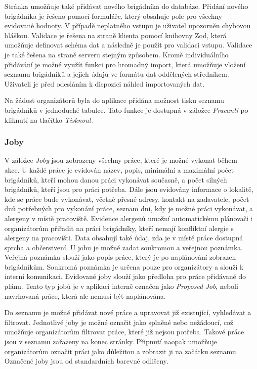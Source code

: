 Stránka umožňuje také přidávat nového brigádníka do databáze. Přidání nového brigádníka je řešeno pomocí formuláře, který obsahuje pole pro všechny evidované
hodnoty. V případě neplatného vstupu je uživatel upozorněn chybovou hláškou. Validace je řešena na straně klienta pomocí knihovny Zod, která umožňuje definovat
schéma dat a následně je použít pro validaci vstupu. Validace je také řešena na straně serveru stejným způsobem. Kromě individuálního přidávání je možné využít
funkci pro hromadný import, která umožňuje vložení seznamu brigádníků a jejich údajů ve formátu dat oddělených středníkem. Uživateli je před odesláním
k dispozici náhled importovaných dat.

Na žádost organizátorů byla do aplikace přidána možnost tisku seznamu brigádníků v jednoduché tabulce. Tato funkce je dostupná v záložce \textit{Pracanti} po kliknutí
na tlačítko \textit{Tisknout}.

\subsubsection{Joby}

V záložce \textit{Joby} jsou zobrazeny všechny práce, které je možné vykonat během akce. U každé práce je evidován název, popis, minimální
a maximální počet brigádníků, kteří mohou danou práci vykonávat současně, a počet silných brigádníků, kteří jsou pro práci potřeba. Dále jsou evidovány
informace o lokalitě, kde se práce bude vykonávat, včetně přesné adresy, kontakt na zadavatele, počet dnů potřebných pro vykonání práce, 
seznam dní, kdy je možné práci vykonávat, a alergeny v místě pracoviště. Evidence alergenů umožní automatickému plánovači i organizátorům přiřadit na práci brigádníky, kteří nemají
konfliktní alergie s alergeny na pracovišti. Data obsahují také údaj, zda je v místě práce dostupná sprcha a občerstvení. 
U jobu je možné zadat soukromou a veřejnou poznámka. Veřejná poznámka slouží jako popis práce, který je po naplánování
zobrazen brigádníkům. Soukromá poznámka je určena pouze pro organizátory a slouží k interní komunikaci. Evidované joby slouží jako předloha pro práce přidávané
do plánu. Tento typ jobů je v aplikaci interně označen jako \textit{Proposed Job}, neboli navrhovaná práce, která ale nemusí být naplánována.

Do seznamu je možné přidávat nové práce a upravovat již existující, vyhledávat a filtrovat.
Jednotlivé joby je možné označit jako splněné nebo nežádoucí, což umožňuje organizátorům filtrovat práce, které již nejsou potřeba. Takové práce jsou v seznamu
zařazeny na konec stránky. Připnutí naopak umožňuje organizátorům označit práci jako důležitou a zobrazit ji na začátku seznamu. Označené joby jsou od standardních
barevně odlišeny.

